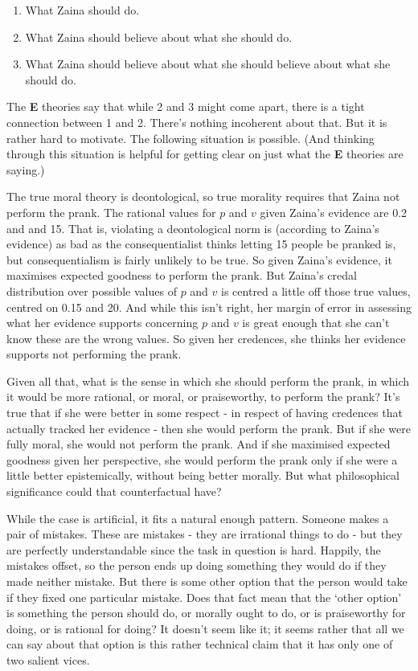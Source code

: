 \begin{enumerate}
\item{} What \gls{Zaina} should do.

\item{} What \gls{Zaina} should believe about what she should do.

\item{} What \gls{Zaina} should believe about what she should believe about what she should do.

\end{enumerate}
The \textbf{E} theories say that while 2 and 3 might come apart, there is a tight connection between 1 and 2. There's nothing incoherent about that. But it is rather hard to motivate. The following situation is possible. (And thinking through this situation is helpful for getting clear on just what the \textbf{E} theories are saying.)

The true moral theory is deontological, so true morality requires that \gls{Zaina} not perform the prank. The rational values for $p$ and $v$ given \gls{Zaina}'s evidence are 0.2 and and 15. That is, violating a deontological norm is (according to Zaina's evidence) as bad as the consequentialist thinks letting 15 people be pranked is, but consequentialism is fairly unlikely to be true. So given \gls{Zaina}'s evidence, it maximises expected goodness to perform the prank. But \gls{Zaina}'s credal distribution over possible values of $p$ and $v$ is centred a little off those true values, centred on 0.15 and 20. And while this isn't right, her margin of error in assessing what her evidence supports concerning $p$ and $v$ is great enough that she can't know these are the wrong values. So given her credences, she thinks her evidence supports not performing the prank.

Given all that, what is the sense in which she should perform the prank, in which it would be more rational, or moral, or praiseworthy, to perform the prank? It's true that if she were better in some respect - in respect of having credences that actually tracked her evidence - then she would perform the prank. But if she were fully moral, she would not perform the prank. And if she maximised expected goodness given her perspective, she would perform the prank only if she were a little better epistemically, without being better morally. But what philosophical significance could that counterfactual have?

While the case is artificial, it fits a natural enough pattern. Someone makes a pair of mistakes. These are mistakes - they are irrational things to do - but they are perfectly understandable since the task in question is hard. Happily, the mistakes offset, so the person ends up doing something they would do if they made neither mistake. But there is some other option that the person would take if they fixed one particular mistake. Does that fact mean that the `other option' is something the person should do, or morally ought to do, or is praiseworthy for doing, or is rational for doing? It doesn't seem like it; it seems rather that all we can say about that option is this rather technical claim that it has only one of two salient vices.

